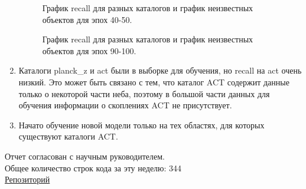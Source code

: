 \documentclass{article}
\begin{document}
\begin{enumerate}
    \begin{figure}[h]
        \caption{График recall для разных каталогов и график неизвестных объектов для эпох 40-50.}
    \end{figure}
    \begin{figure}[h]
        \caption{График recall для разных каталогов и график неизвестных объектов для эпох 90-100.}
    \end{figure}
    \item Каталоги planck\_z и act были в выборке для обучения, но recall на act очень низкий. Это 
        может быть связано с тем, что каталог ACT содержит данные только о некоторой части неба, 
        поэтому в большой части данных для обучения информации о скоплениях ACT не присутствует. \\
    \item Начато обучение новой модели только на тех областях, для которых существуют каталоги ACT.\\
\end{enumerate}

Отчет согласован с научным руководителем.\\
Общее количество строк кода за эту неделю: 344\\
\hyperlink{https://github.com/rt2122/data-segmentation-2}{Репозиторий}\\ 
\end{document}

